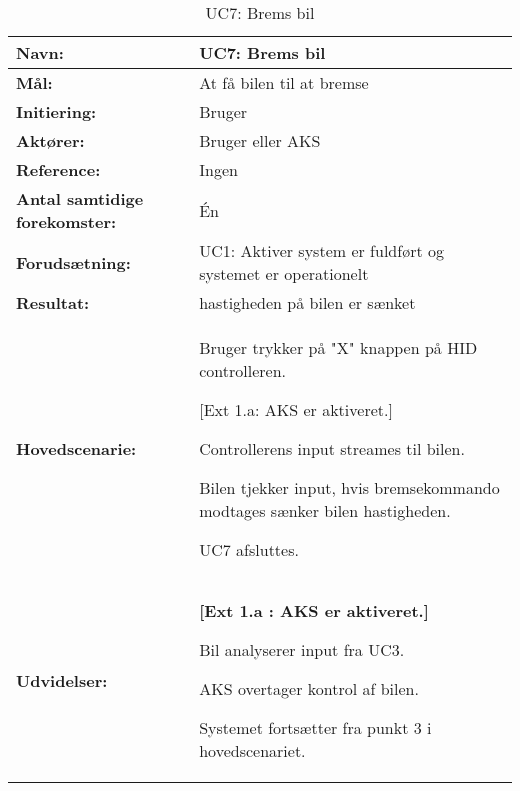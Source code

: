 \begin{table}[h]
\begin{tabularx}{\textwidth}{| L{3.3 cm} | Z |} \hline

\textbf{Navn:} 							& UC7: Brems bil												\\ \hline
\textbf{Mål:}							& At få bilen til at bremse 									\\ \hline
\textbf{Initiering:}					& Bruger 														\\ \hline
\textbf{Aktører:} 						& Bruger eller AKS 												\\ \hline
\textbf{Reference:} 					& Ingen															\\ \hline
\textbf{Antal samtidige forekomster:} 	& Én 															\\ \hline
\textbf{Forudsætning:} 					& UC1: Aktiver system er fuldført og systemet er operationelt 	\\ \hline
\textbf{Resultat:}						& hastigheden på bilen er sænket 								\\ \hline
\textbf{Hovedscenarie:}					& 

\begin{packed_enum}
\item Bruger trykker på "X" knappen på HID controlleren.
	\begin{packed_item}\itemsep1pt \parskip0pt 
	\item {[}Ext 1.a: AKS er aktiveret.{]}
	\end{packed_item}
\item Controllerens input streames til bilen.
\item Bilen tjekker input, hvis bremsekommando modtages sænker bilen hastigheden.
\item UC7 afsluttes.
\end{packed_enum} \\ \hline
\textbf{Udvidelser:}					&  
\textbf{{[}Ext 1.a : AKS er aktiveret.{]}}
	\begin{packed_enum}\itemsep1pt \parskip0pt 
		\item Bil analyserer input fra UC3. %
		\item AKS overtager kontrol af bilen. %
		\item Systemet fortsætter fra punkt 3 i hovedscenariet.
	\end{packed_enum}
\\ \hline
\end{tabularx}
\caption{UC7: Brems bil}
\label{tbl:UC7}
\end{table}